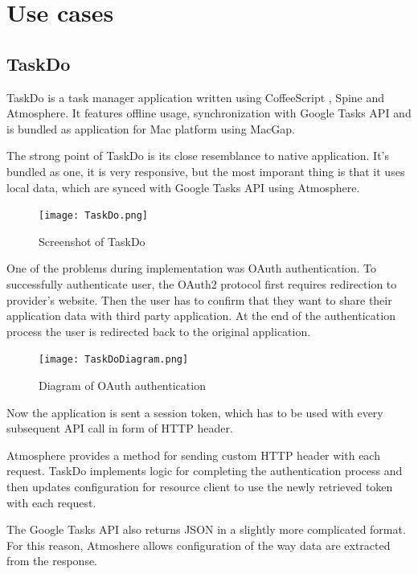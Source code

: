\section{Use cases}

\subsection{TaskDo}

TaskDo \citep{taskdo} is a task manager application written using CoffeeScript \citep{coffeescript}, Spine \citep{spinejs} and Atmosphere. It features offline usage, synchronization with Google Tasks API \citep{google_tasks} and is bundled as application for Mac platform using MacGap. \citep{macgap}

The strong point of TaskDo is its close resemblance to native application. It's bundled as one, it is very responsive, but the most imporant thing is that it uses local data, which are synced with Google Tasks API using Atmosphere.

\begin{figure}[htbp]
  \centering
    \texttt{[image: TaskDo.png]}
  \caption{Screenshot of TaskDo}
  \label{fig:taskdo}
\end{figure}

One of the problems during implementation was OAuth authentication. To successfully authenticate user, the OAuth2 protocol \citep{oauth} first requires redirection to provider's website. Then the user has to confirm that they want to share their application data with third party application. At the end of the authentication process the user is redirected back to the original application.

\begin{figure}[ht!]
  \centering
    \texttt{[image: TaskDoDiagram.png]}
  \caption{Diagram of OAuth authentication}
  \label{fig:taskdo_diagram}
\end{figure}

Now the application is sent a session token, which has to be used with every subsequent API call in form of HTTP header.

Atmosphere provides a method for sending custom HTTP header with each request. TaskDo implements logic for completing the authentication process and then updates configuration for resource client to use the newly retrieved token with each request.

The Google Tasks API also returns JSON in a slightly more complicated format. For this reason, Atmoshere allows configuration of the way data are extracted from the response.

